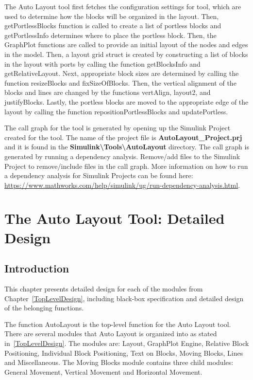\documentclass[12pt,letterpaper]{report}
\newcommand{\tool}{Auto Layout\xspace}
\begin{document}
\par The \tool tool first fetches the configuration settings for tool, which are used to determine how the blocks will be organized in the layout. Then, getPortlessBlocks function is called to create a list of portless blocks and getPortlessInfo determines where to place the portless block. Then, the GraphPlot functions are called to provide an initial layout of the nodes and edges in the model. Then, a layout grid struct is created by constructing a list of blocks in the layout with ports by calling the function getBlocksInfo and getRelativeLayout. Next, appropriate block sizes are determined by calling the function resizeBlocks and fixSizeOfBlocks. Then, the vertical alignment of the blocks and lines are changed by the functions vertAlign, layout2, and justifyBlocks. Lastly, the portless blocks are moved to the appropriate edge of the layout by calling the function repositionPortlessBlocks and updatePortless.
\par The call graph for the tool is generated by opening up the Simulink Project created for the tool. The name of the project file is \textbf{AutoLayout\_Project.prj} and it is found in the \textbf{Simulink\textbackslash Tools\textbackslash AutoLayout} directory. The call graph is generated by running a dependency analysis. Remove/add files to the Simulink Project to remove/include files in the call graph. More information on how to run a dependency analysis for Simulink Projects can be found here:  \url{https://www.mathworks.com/help/simulink/ug/run-dependency-analysis.html}.
\chapter{The \tool Tool: Detailed Design} \label{LayoutModules}
\section{Introduction}
 This chapter presents detailed design for each of the modules from Chapter~\ref{TopLevelDesign}, including black-box specification and detailed design of the belonging functions.
 \par The function AutoLayout is the top-level function for the \tool tool. There are several modules that \tool is organized into as stated in~\ref{TopLevelDesign}. The modules are: Layout, GraphPlot Engine, Relative Block Positioning, Individual Block Positioning, Text on Blocks, Moving Blocks, Lines and Miscellaneous. The Moving Blocks module contains three child modules: General Movement, Vertical Movement and Horizontal Movement.
\end{document}
